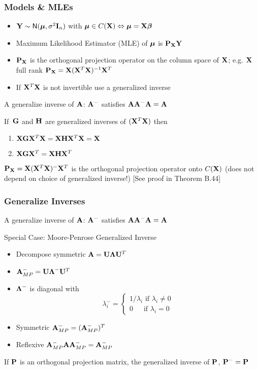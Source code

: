 \documentclass[handout]{beamer}\usepackage[]{graphicx}\usepackage[]{color}
\begin{document}
\begin{frame} \frametitle{Models \& MLEs}
  \begin{itemize}
  \item   $\Y \sim \N(\mub, \sigma^2 \I_n)$ with $\mub \in C(\X)
    \Leftrightarrow \mub = \X \b$  \pause
  \item  Maximum Likelihood Estimator (MLE) of $\mub$ is
    $\P_\X \Y$  \pause
\item $\P_\X$ is the orthogonal projection operator on the column
  space of $\X$; e.g. $\X$ full rank $\P_\X = \X (\X^T\X)^{-1} \X^T$
  \pause
\item If $\X^T\X$ is not invertible use a generalized inverse
\end{itemize}
A generalize inverse of $\A$: $\A^{-}$ satisfies   $\A \A^- \A = \A$
\begin{lemma}[B.43]
  If $\, \G$ and $\H$ are generalized inverses of $(\X^T\X)$ then
  \begin{enumerate}
  \item $\X \G \X^T \X = \X \H \X^T \X = \X$
  \item $\X \G \X^T = \X \H \X^T$
  \end{enumerate}
\end{lemma} \pause
$\P_\X = \X (\X^T\X)^{-} \X^T$ is the orthogonal projection operator
onto $C(\X)$   (does not depend on choice of generalized inverse!)
[See proof in Theorem B.44]
\end{frame}
\begin{frame}
  \frametitle{Generalize Inverses}

A generalize inverse of $\A$: $\A^{-}$ satisfies   $\A \A^- \A = \A$


Special Case: Moore-Penrose Generalized Inverse  \pause


\begin{itemize}
\item Decompose symmetric $\A = \U \Lambdab \U^T$  \pause
\item $\A^-_{MP} = \U \Lambdab^- \U^T$  \pause
\item $\Lambdab^-$ is diagonal with $$ \lambda_i^- = \left\{
    \begin{array}{l}
   1/\lambda_i \text{ if } \lambda_i \neq 0 \\
   0 \quad \, \text{  if } \lambda_i = 0
    \end{array}
\right.$$  \pause
\item Symmetric  $\A^-_{MP} = (\A^-_{MP})^T $  \pause
\item Reflexive  $\A^-_{MP}\A \A^-_{MP} = \A^-_{MP} $  \pause
\end{itemize}

If $\P$ is an orthogonal projection matrix, the generalized inverse of
$\P$, $\P^- = \P$


\end{frame}
\end{document}
